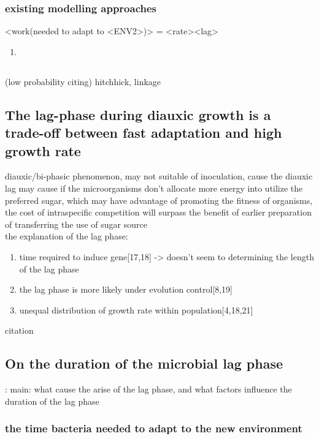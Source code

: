 \subsubsection{existing modelling approaches}
<work(needed to adapt to <ENV2>)> = <rate><lag>
\begin{enumerate}
    \item 
\end{enumerate}


\subsection{\citep{lenski1998evolution}}
(low probability citing)
hitchhick, linkage


\subsection{The lag-phase during diauxic growth is a trade-off between fast adaptation and high growth rate \citep{chu2016lag}}

diauxic/bi-phasic phenomenon, may not suitable of inoculation, cause the diauxic lag may cause if the microorganisms don't allocate more energy into utilize the preferred sugar, which may have advantage of promoting the fitness of organisms, the cost of intraspecific competition will surpass the benefit of earlier preparation of transferring the use of sugar source \\
the explanation of the lag phase: \\
\begin{enumerate}
    \item time required to induce gene[17,18] -> doesn't seem to determining the length of the lag phase
    \item the lag phase is more likely under evolution control[8,19]
    \item unequal distribution of growth rate within population[4,18,21]
\end{enumerate} citation



\subsection{On the duration of the microbial lag phase \citep{vermeersch2019duration}}:
main: what cause the arise of the lag phase, and what factors influence the duration of the lag phase
\subsubsection{the time bacteria needed to adapt to the new environment}
